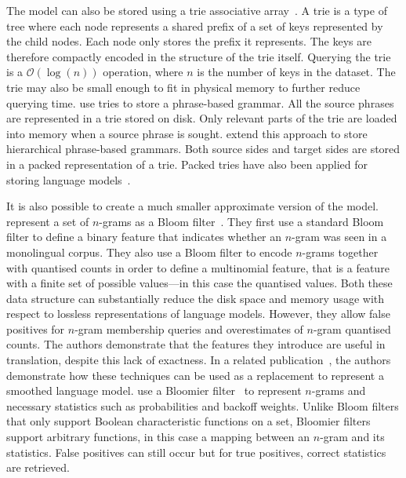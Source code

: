 The model can also be stored using a trie associative
array~\citep{fredkin:1960:ACM}. A trie is a type of tree where each node
represents a shared prefix of a set of keys represented by the child nodes. Each
node only stores the prefix it represents. The keys are therefore compactly
encoded in the structure of the trie itself. Querying the trie is a
$\mathcal{O}(\log(n))$ operation, where $n$ is the number of keys in the
dataset. The trie may also be small enough to fit in physical memory to further
reduce querying time. \citet{zens-ney:2007:HLTNAACL} use tries
to store a phrase-based grammar. All the source phrases are represented
in a trie stored on disk. Only relevant parts of the trie are loaded into
memory when a source phrase is sought.
\citet{ganitkevitch-cao-weese-post-callisonburch:2012:WMT} extend this
approach to store hierarchical phrase-based grammars. Both
source sides and target sides are stored in a packed representation of a trie.
Packed tries have also been applied for storing language
models~\citep{pauls-klein:2011:HLTACL,heafield:2011:WMT}.

It is also possible to create a much smaller approximate version of the model.
\citet{talbot-osborne:2007:ACL} represent a set of $n$-grams as a Bloom
filter~\citep{bloom:1970:ACM}.
They first use a standard Bloom filter to define a binary feature that
indicates whether an $n$-gram was seen in a monolingual corpus. They
also use a Bloom filter to encode $n$-grams together with quantised counts
in order to define a multinomial feature, that is a feature
with a finite set of possible values---in this case the quantised values. Both these data structure can
substantially reduce the disk space and memory usage with respect to lossless
representations of language models. However, they allow
false positives for $n$-gram
membership queries and overestimates of $n$-gram quantised counts. The authors
demonstrate that the features they introduce are useful in translation, despite
this lack of exactness.
In a related publication~\citep{talbot-osborne:2007:EMNLP-CoNLL}, the authors
demonstrate how these techniques can be used as a replacement to represent
a smoothed language model. \citet{talbot-brants:2008:ACL} use a Bloomier
filter~\citep{chazelle-kilian-rubinfeld-tal:2004:ACM-SIAM}
to represent $n$-grams and necessary statistics such as probabilities and backoff
weights. Unlike Bloom filters that only support Boolean characteristic
functions on a set, Bloomier filters support arbitrary functions, in this case
a mapping between an $n$-gram and its statistics. False positives can still occur
but for true positives, correct statistics are retrieved.

